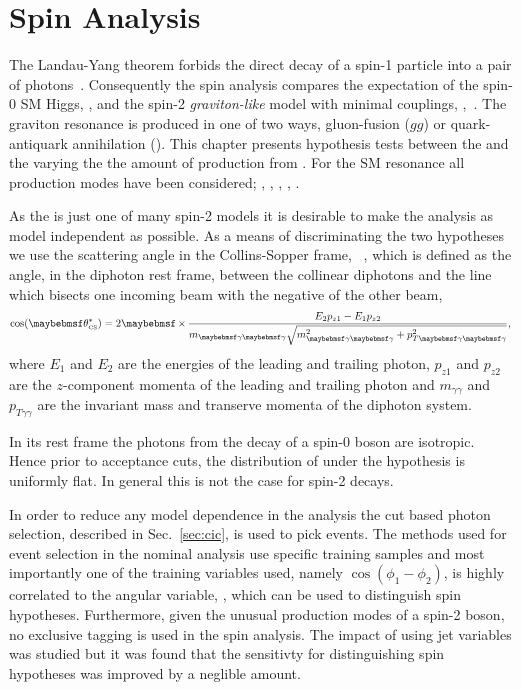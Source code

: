 \chapter{Spin Analysis}
\label{chap:spin}

The Landau-Yang theorem forbids the direct decay of a spin-1 particle into a pair of photons~\cite{Landau1948,Yang1950}. 
Consequently the spin analysis compares the expectation of the spin-0 SM Higgs, \zerop, and the spin-2 \emph{graviton-like} 
model with minimal couplings, \twomp,~\cite{Gao2010}. The \twomp graviton resonance is produced in one of two ways, gluon-fusion ($gg$) 
or quark-antiquark annihilation (\qqbar). This chapter presents hypothesis tests between the \zerop and the \twomp varying the the amount of 
\twomp production from \qqbar. For the \zerop SM 
resonance all production modes have been considered; \ggH, \VBF, \WH, \ZH, \ttH. 

As the \twomp is just one of many spin-2 models it is desirable to make the analysis as model independent as possible. As a means of 
discriminating the two hypotheses we use the scattering angle in the Collins-Sopper frame, \costhetastar ~\cite{CollinsSoper1977}, which is defined as the angle, in the diphoton rest frame, between the collinear diphotons 
and the line which bisects one incoming beam with the negative of the other beam, 
\begin{equation}
  \cos(\theta^{\ast}_{\mbox{\tiny{CS}}}) = 2\times\frac{E_{2}p_{z1}-E_{1}p_{z2}}{m_{\gamma\gamma}\sqrt{m^{2}_{\gamma\gamma}+p^{2}_{T\gamma\gamma}}},
\end{equation}
where $E_{1}$ and $E_{2}$ are the energies of the leading and trailing photon, $p_{z1}$ and $p_{z2}$ are the $z$-component momenta 
of the leading and trailing photon and $m_{\gamma\gamma}$ and $p_{T\gamma\gamma}$ are the invariant mass and transerve momenta of the diphoton system.

In its rest frame the photons from the decay of a spin-0 boson are isotropic. Hence prior to acceptance cuts, the distribution of \costhetastar 
under the \zerop hypothesis is uniformly flat. In general this is not the case for spin-2 decays. 

In order to reduce any model dependence in the analysis the cut based photon selection, described in Sec.~\ref{sec:cic}, is used to pick events. The \MVA methods used for event selection in the nominal analysis use specific \SM \MC training samples and most importantly one of the training variables used, namely $\cos(\phi_{1}-\phi_{2})$, is highly correlated to the angular variable, \costhetastar, which can be used to distinguish spin hypotheses. Furthermore, given the unusual production modes of a spin-2 boson, no exclusive tagging is used in the spin analysis. The impact of using jet variables was studied but it was found that the sensitivty for distinguishing spin hypotheses was improved by a neglible amount.

